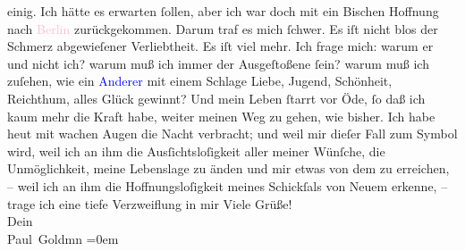                einig. Ich hätte es erwarten ſollen, aber ich war doch mit ein Bischen Hoffnung nach
                  \textcolor{pink}{Berlin}{}\ledrightnote{\textcolor{pink}{Berlin}} zurückgekommen. Darum traf es mich
               ſchwer. Es iſt nicht blos der Schmerz abgewieſener Verliebtheit. Es iſt viel mehr.
               Ich frage mich: warum er und nicht ich? warum muß ich immer der Ausgeſtoßene ſein?
               warum muß ich {\pb}zuſehen, wie ein \textcolor{blue}{Anderer}{}\ledrightnote{{$\rightarrow$}\textcolor{blue}{Alfred Kerr}} mit einem Schlage Liebe, Jugend,
               Schönheit, Reichthum, alles Glück gewinnt? Und mein Leben ſtarrt vor Öde, ſo daß ich
               kaum mehr die Kraft habe, weiter meinen Weg zu gehen, wie bisher. Ich habe heut mit wachen Augen die Nacht verbracht; und weil mir
               dieſer Fall zum Symbol wird, weil ich an ihm die Ausſichtsloſigkeit aller meiner
               Wünſche, die Unmöglichkeit, meine Lebenslage zu änden und mir etwas von dem \label{K_L02932-2v}\label{K_L02932-2h} zu erreichen, – weil ich an ihm die
               Hoffnungsloſigkeit meines Schickſals von Neuem erkenne, – trage ich eine tiefe
               Verzweiflung in mir{\dotsfive}\pend
           \pstart
           Viele Grüße! {\\[\baselineskip]}Dein {\\[\baselineskip]}\spacefill\mbox{Paul Goldmn}\pend
           \leftskip=0em{}\endnumbering{}\begin{anhang}\end{anhang}
      